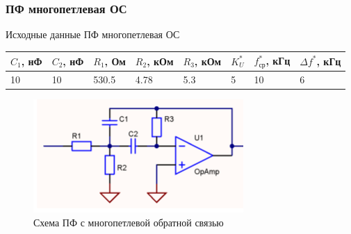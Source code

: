 \documentclass[a4paper, 12pt]{article}
\begin{document}
    \subsubsection{ПФ многопетлевая ОС} \label{sec:strip_multi}
    Исходные данные ПФ многопетлевая ОС
    \begin{center}
        \begin{tabular}{ | m{3.5em} | m{3.5em}| m{3.5em} | m{4em} | m{4em} | m{2.5em} | m{4em} | m{4.5em} |} 
        \hline
        $C_1$, нФ&$C_2$, нФ&$R_1$, Ом&$R_2$, кОм&$R_3$, кОм&$K_U^*$&$f_\text{ср}^*$, кГц &$\Delta f^*$, кГц\\ 
        \hline
        10&10&530.5&4.78&5.3&5&10&6\\ 
        \hline
        \end{tabular}
    \end{center}
    \begin{figure}[H]
        \centering
        \includegraphics[scale=0.9]{strip_multi.png}
        \captionsetup{skip=0pt}
        \caption{Схема ПФ с многопетлевой обратной связью}
        \label{fig:null_scheme4}
    \end{figure}
\end{document}
